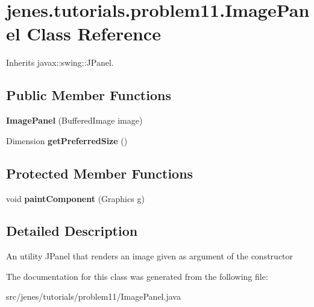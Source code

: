 \hypertarget{classjenes_1_1tutorials_1_1problem11_1_1_image_panel}{
\section{jenes.tutorials.problem11.ImagePanel Class Reference}
\label{classjenes_1_1tutorials_1_1problem11_1_1_image_panel}
}
Inherits javax::swing::JPanel.

\subsection*{Public Member Functions}
\begin{CompactItemize}
\item 
\hypertarget{classjenes_1_1tutorials_1_1problem11_1_1_image_panel_72e9d512f6d00f9ab6fd18bf052f35fd}{
\textbf{ImagePanel} (BufferedImage image)}
\label{classjenes_1_1tutorials_1_1problem11_1_1_image_panel_72e9d512f6d00f9ab6fd18bf052f35fd}

\item 
\hypertarget{classjenes_1_1tutorials_1_1problem11_1_1_image_panel_fa537b7985f0ccfc8ad9896df39595c7}{
Dimension \textbf{getPreferredSize} ()}
\label{classjenes_1_1tutorials_1_1problem11_1_1_image_panel_fa537b7985f0ccfc8ad9896df39595c7}

\end{CompactItemize}
\subsection*{Protected Member Functions}
\begin{CompactItemize}
\item 
\hypertarget{classjenes_1_1tutorials_1_1problem11_1_1_image_panel_734663d1d6aeb4f2e02e788db04a1444}{
void \textbf{paintComponent} (Graphics g)}
\label{classjenes_1_1tutorials_1_1problem11_1_1_image_panel_734663d1d6aeb4f2e02e788db04a1444}

\end{CompactItemize}


\subsection{Detailed Description}
An utility JPanel that renders an image given as argument of the constructor 

The documentation for this class was generated from the following file:\begin{CompactItemize}
\item 
src/jenes/tutorials/problem11/ImagePanel.java\end{CompactItemize}
